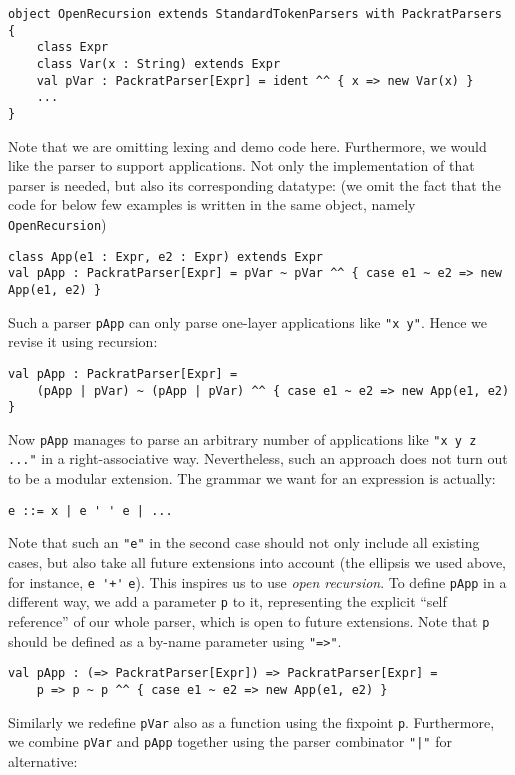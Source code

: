 \begin{lstlisting}
object OpenRecursion extends StandardTokenParsers with PackratParsers {
    class Expr
    class Var(x : String) extends Expr
    val pVar : PackratParser[Expr] = ident ^^ { x => new Var(x) }
    ...
}
\end{lstlisting}
Note that we are omitting lexing and demo code here. Furthermore, we would like the parser to support applications.
Not only the implementation of that parser is needed, but also its corresponding datatype: (we omit the fact that the code for below few
examples is written in the same object, namely \lstinline{OpenRecursion})
\begin{lstlisting}
class App(e1 : Expr, e2 : Expr) extends Expr
val pApp : PackratParser[Expr] = pVar ~ pVar ^^ { case e1 ~ e2 => new App(e1, e2) }
\end{lstlisting}
Such a parser \lstinline{pApp} can only parse one-layer applications like \lstinline{"x y"}. Hence we revise it using recursion:
\begin{lstlisting}
val pApp : PackratParser[Expr] =
    (pApp | pVar) ~ (pApp | pVar) ^^ { case e1 ~ e2 => new App(e1, e2) }
\end{lstlisting}
Now \lstinline{pApp} manages to parse an arbitrary number of applications like \lstinline{"x y z ..."} in a right-associative way.
Nevertheless, such an approach does not turn out to be a modular extension. The grammar we want for an expression is actually:
\begin{lstlisting}
e ::= x | e ' ' e | ...
\end{lstlisting}
Note that such an \lstinline{"e"} in the second case should not only include all existing cases, but also take all future extensions into account (the ellipsis we used above, for instance, \lstinline{e '+'} \lstinline{e}). This inspires us to use \textit{open recursion}. To define \lstinline{pApp} in a different way, we add a parameter \lstinline{p} to it, representing the explicit ``self reference'' of our whole parser, which is open to future extensions. Note that \lstinline{p} should be defined as a by-name parameter using \lstinline{"=>"}.
\begin{lstlisting}
val pApp : (=> PackratParser[Expr]) => PackratParser[Expr] =
    p => p ~ p ^^ { case e1 ~ e2 => new App(e1, e2) }
\end{lstlisting}
Similarly we redefine \lstinline{pVar} also as a function using the fixpoint \lstinline{p}. Furthermore, we combine \lstinline{pVar} and \lstinline{pApp} together using the parser combinator \lstinline{"|"} for alternative:
